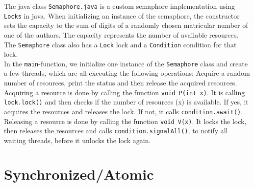 \documentclass{article}
\begin{document}
    The java class \texttt{Semaphore.java} is a custom semaphore implementation using \texttt{Locks} in java. When initializing an instance of the semaphore, the constructor sets the capacity to the sum of digits of a randomly chosen matricular number of one of the authors. The capacity represents the number of available resources. The \texttt{Semaphore} class also has a \texttt{Lock} lock and a \texttt{Condition} condition for that lock.\\
    In the \texttt{main}-function, we initialize one instance of the \texttt{Semaphore} class and create a few threads, which are all executing the following operations: Acquire a random number of resources, print the status and then release the acquired resources.\\
    Acquiring a resource is done by calling the function \texttt{void P(int x)}. It is calling \texttt{lock.lock()} and then checks if the number of resources (x) is available. If yes, it acquires the resources and releases the lock. If not, it calls \texttt{condition.await()}. Releasing a resource is done by calling the function \texttt{void V(x)}. It locks the lock, then releases the resources and calls \texttt{condition.signalAll()}, to notify all waiting threads, before it unlocks the lock again.

  \section{Synchronized/Atomic}
\end{document}
